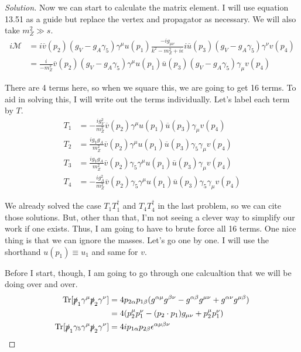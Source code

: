 \documentclass[12pt]{article}
\newenvironment{solution}{\begin{proof}[Solution]}{\end{proof}}
\begin{document}
\begin{solution}
Now we can start to calculate the matrix element. I will use equation 13.51 as a guide but replace the vertex and propagator as necessary. We will also take $m_Z^2\gg s$.
\begin{align*}
    i\mathcal{M}&=i\overline{v}(p_2)(g_V-g_A\gamma_5)\gamma^\mu u(p_1)\frac{-ig_{\mu\nu}}{k^2-m_Z^2+i\epsilon}i\overline{u}(p_3)(g_V-g_A\gamma_5)\gamma^\nu v(p_4) \\
    &= \frac{i}{-m_Z^2}\overline{v}(p_2)(g_V-g_A\gamma_5)\gamma^\mu u(p_1)\overline{u}(p_3)(g_V-g_A\gamma_5)\gamma_\mu v(p_4)
\end{align*}

There are 4 terms here, so when we square this, we are going to get 16 terms. To aid in solving this, I will write out the terms individually. Let's label each term by $T$.
\begin{align*}
    T_1&=-\frac{ig_V^2}{m_Z^2}\overline{v}(p_2)\gamma^\mu u(p_1)\overline{u}(p_3)\gamma_\mu v(p_4) \\
    T_2 &= \frac{ig_Vg_A}{m_Z^2}\overline{v} (p_2)\gamma^\mu u(p_1)\overline{u} (p_3)\gamma_5\gamma_\mu v(p_4) \\
    T_3 &= \frac{ig_Vg_A}{m_Z^2}\overline{v}(p_2)\gamma_5\gamma^\mu u(p_1)\overline{u}(p_3)\gamma_\mu v(p_4) \\
    T_4 &= -\frac{i g_A^2}{m_Z^2}\overline{v}(p_2)\gamma_5\gamma^\mu u(p_1)\overline{u}(p_3)\gamma_5\gamma_\mu v(p_4)
\end{align*}

We already solved the case $T_1T_1^\dagger$ and $T_4T_4^\dagger$ in the last problem, so we can cite those solutions. But, other than that, I'm not seeing a clever way to simplify our work if one exists. Thus, I am going to have to brute force all 16 terms. One nice thing is that we can ignore the masses. Let's go one by one. I will use the shorthand $u(p_1)\equiv u_1$ and same for $v$.

Before I start, though, I am going to go through one calcualtion that we will be doing over and over.
\begin{align*}
    \text{Tr}[\slashed{p}_1\gamma^\mu\slashed{p}_2\gamma^\nu] &=4p_{2\alpha}p_{1\beta}(g^{\alpha\mu}g^{\beta\nu}-g^{\alpha\beta}g^{\mu\nu}+g^{\alpha\nu}g^{\mu\beta}) \\ 
    &=4(p_2^\mu p_1^\nu-(p_2\cdot p_1) g_{\mu\nu}+p_2^\mu p_1^\nu) \\
    \text{Tr}[\slashed{p}_1\gamma_5\gamma^\mu\slashed{p}_2\gamma^\nu] &=4ip_{1\alpha}p_{2\beta}\epsilon^{\alpha \mu \beta \nu} \\ 
\end{align*}


\end{solution}
\end{document}
